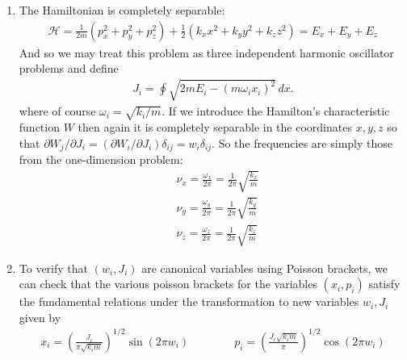 \documentclass{article}
\theoremstyle{definition}
\newcommand{\p}{\partial}
\newcommand{\ham}{\mathcal{H}}
\newcommand{\f}[2]{\frac{#1}{#2}}
\newcommand{\lp}{\left(}
\newcommand{\rp}{\right)}
\begin{document}
\begin{enumerate}[label=(\alph*)]
	\item The Hamiltonian is completely separable:
	\begin{align*}
	\ham = \f{1}{2m}(p_x^2 + p_y^2 + p_z^2) + \f{1}{2}(k_xx^2 + k_y y^2 + k_z z^2) = E_x + E_y + E_z
	\end{align*}
	And so we may treat this problem as three independent harmonic oscillator problems and define 
	\begin{align*}
	J_i = \oint \sqrt{2mE_i - (m\omega_i x_i)^2}\,dx.
	\end{align*}
	where of course $\omega_i = \sqrt{k_i/m}$. If we introduce the Hamilton's characteristic function $W$ then again it is completely separable in the coordinates $x,y,z$ so that $\p W_j/\p J_i = (\p W_i/\p J_i) \delta_{ij} = w_i \delta_{ij}$. So the frequencies are simply those from the one-dimension problem:
	\begin{align*}
	&\nu_x =  \f{\omega_x}{2\pi} = \f{1}{2\pi}\sqrt{\f{k_x}{m}}\\
	&\nu_y =  \f{\omega_y}{2\pi} = \f{1}{2\pi}\sqrt{\f{k_y}{m}}\\
	&\nu_z =  \f{\omega_z}{2\pi} = \f{1}{2\pi}\sqrt{\f{k_z}{m}}
	\end{align*} 
	
	
	\item 
	
	To verify that $(w_i,J_i)$ are canonical variables using Poisson brackets, we can check that the various poisson brackets for the variables $(x_i,p_i)$ satisfy the fundamental relations under the transformation to new variables $w_i,J_i$ given by 
	\begin{align*}
	x_i = \lp \f{J_i}{\pi \sqrt{k_im }}\rp^{1/2}\sin(2\pi w_i) \quad\quad\quad\quad 
	p_i = \lp \f{J_i\sqrt{k_im}}{\pi} \rp^{1/2} \cos (2\pi w_i) 
	\end{align*}
	
	
	

\end{enumerate}
\end{document}
